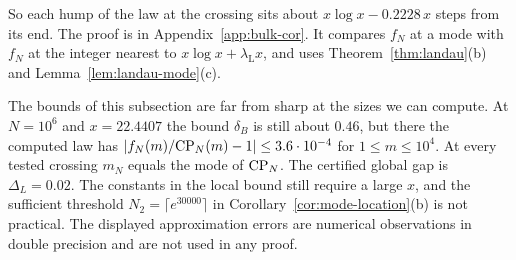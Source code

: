 So each hump of the law at the crossing sits about
$x\log x-0.2228\,x$ steps from its end. The proof is in
Appendix~\ref{app:bulk-cor}. It compares $f_N$ at a mode with $f_N$ at the
integer nearest to $x\log x+\lambda_{\mathrm L}x$, and uses
Theorem~\ref{thm:landau}(b) and Lemma~\ref{lem:landau-mode}(c).

\begin{remark}\label{rem:bulk}
The bounds of this subsection are far from sharp at the sizes we can
compute. At $N=10^6$ and $x=22.4407$ the bound $\delta_B$ is still about
$0.46$, but there the computed law has
$\lvert f_N(m)/\mathrm{CP}_N(m)-1\rvert\le3.6\cdot10^{-4}$ for $1\le m\le10^4$. At
every tested crossing $m_N$ equals the mode of $\mathrm{CP}_N$. The certified global gap is $\Delta_L=0.02$.
The constants in the local bound still require a large $x$, and
the sufficient threshold $N_2=\lceil e^{30000}\rceil$ in
Corollary~\ref{cor:mode-location}(b) is not practical.
The displayed approximation errors are numerical observations in
double precision and are not used in any proof.
\end{remark}
